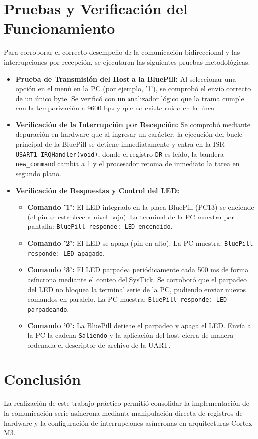 \documentclass{plantilla}
\begin{document}
\section{Pruebas y Verificación del Funcionamiento}
Para corroborar el correcto desempeño de la comunicación bidireccional y las interrupciones por recepción, se ejecutaron las siguientes pruebas metodológicas:
\begin{itemize}
    \item \textbf{Prueba de Transmisión del Host a la BluePill:} Al seleccionar una opción en el menú en la PC (por ejemplo, '1'), se comprobó el envío correcto de un único byte. Se verificó con un analizador lógico que la trama cumple con la temporización a 9600 bps y que no existe ruido en la línea.
    \item \textbf{Verificación de la Interrupción por Recepción:} Se comprobó mediante depuración en hardware que al ingresar un carácter, la ejecución del bucle principal de la BluePill se detiene inmediatamente y entra en la ISR \texttt{USART1\_IRQHandler(void)}, donde el registro \texttt{DR} es leído, la bandera \texttt{new\_command} cambia a 1 y el procesador retoma de inmediato la tarea en segundo plano.
    \item \textbf{Verificación de Respuestas y Control del LED:}
    \begin{itemize}
        \item \textbf{Comando '1':} El LED integrado en la placa BluePill (PC13) se enciende (el pin se establece a nivel bajo). La terminal de la PC muestra por pantalla: \texttt{BluePill responde: LED encendido}.
        \item \textbf{Comando '2':} El LED se apaga (pin en alto). La PC muestra: \texttt{BluePill responde: LED apagado}.
        \item \textbf{Comando '3':} El LED parpadea periódicamente cada 500 ms de forma asíncrona mediante el conteo del SysTick. Se corroboró que el parpadeo del LED no bloquea la terminal serie de la PC, pudiendo enviar nuevos comandos en paralelo. La PC muestra: \texttt{BluePill responde: LED parpadeando}.
        \item \textbf{Comando '0':} La BluePill detiene el parpadeo y apaga el LED. Envía a la PC la cadena \texttt{Saliendo} y la aplicación del host cierra de manera ordenada el descriptor de archivo de la UART.
    \end{itemize}
\end{itemize}

\section{Conclusión}
La realización de este trabajo práctico permitió consolidar la implementación de la comunicación serie asíncrona mediante manipulación directa de registros de hardware y la configuración de interrupciones asíncronas en arquitecturas Cortex-M3.
\end{document}
